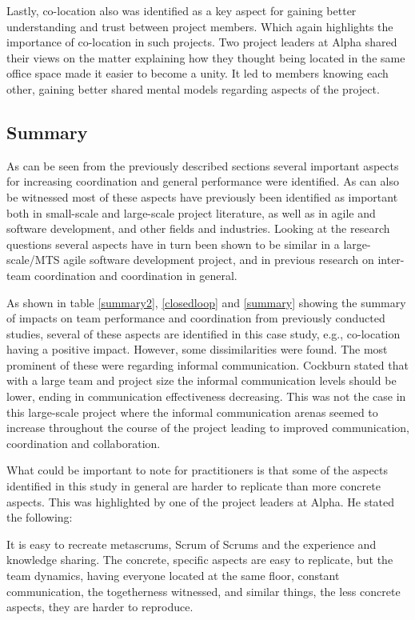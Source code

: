 Lastly, co-location also was identified as a key aspect for gaining better understanding and trust between project members. Which again highlights the importance of co-location in such projects. Two project leaders at Alpha shared their views on the matter explaining how they thought being located in the same office space made it easier to become a unity. It led to members knowing each other, gaining better shared mental models regarding aspects of the project.

\subsection{Summary}

As can be seen from the previously described sections several important aspects for increasing coordination and general performance were identified. As can also be witnessed most of these aspects have previously been identified as important both in small-scale and large-scale project literature, as well as in agile and software development, and other fields and industries. Looking at the research questions several aspects have in turn been shown to be similar in a large-scale/MTS agile software development project, and in previous research on inter-team coordination and coordination in general.

As shown in table \ref{summary2}, \ref{closedloop} and \ref{summary} showing the summary of impacts on team performance and coordination from previously conducted studies, several of these aspects are identified in this case study, e.g., co-location having a positive impact. However, some dissimilarities were found. The most prominent of these were regarding informal communication. Cockburn \cite{Cockburn2000} stated that with a large team and project size the informal communication levels should be lower, ending in communication effectiveness decreasing. This was not the case in this large-scale project where the informal communication arenas seemed to increase throughout the course of the project leading to improved communication, coordination and collaboration.

What could be important to note for practitioners is that some of the aspects identified in this study in general are harder to replicate than more concrete aspects. This was highlighted by one of the project leaders at Alpha. He stated the following:

\begin{fancyquotes}
It is easy to recreate metascrums, Scrum of Scrums and the experience and knowledge sharing. The concrete, specific aspects are easy to replicate, but the team dynamics, having everyone located at the same floor, constant communication, the togetherness witnessed, and similar things, the less concrete aspects, they are harder to reproduce.
\end{fancyquotes}

